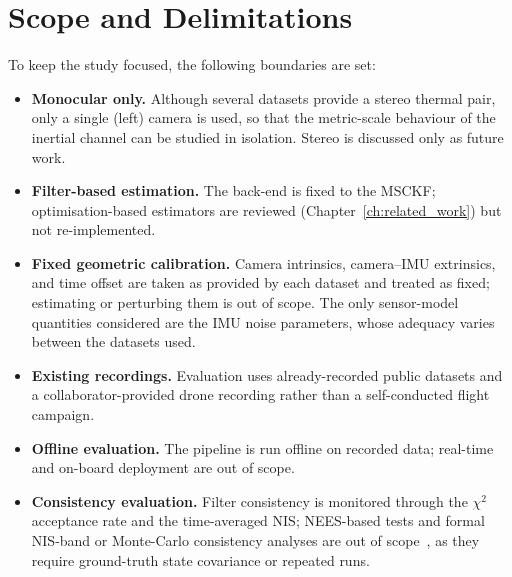 \section{Scope and Delimitations}
\label{sec:scopeanddelimitations}

To keep the study focused, the following boundaries are set:
%
\begin{itemize}
  \item \textbf{Monocular only.} Although several datasets provide a stereo thermal pair, only a single (left) camera is used, so that the metric-scale behaviour of the inertial channel can be studied in isolation. Stereo is discussed only as future work.
  \item \textbf{Filter-based estimation.} The back-end is fixed to the MSCKF; optimisation-based estimators are reviewed (Chapter~\ref{ch:related_work}) but not re-implemented.
  \item \textbf{Fixed geometric calibration.} Camera intrinsics, camera--IMU extrinsics, and time offset are taken as provided by each dataset and treated as fixed; estimating or perturbing them is out of scope. The only sensor-model quantities considered are the IMU noise parameters, whose adequacy varies between the datasets used.
  \item \textbf{Existing recordings.} Evaluation uses already-recorded public datasets and a collaborator-provided drone recording rather than a self-conducted flight campaign.
  \item \textbf{Offline evaluation.} The pipeline is run offline on recorded data; real-time and on-board deployment are out of scope.
  \item \textbf{Consistency evaluation.} Filter consistency is monitored through the $\chi^2$ acceptance rate and the time-averaged NIS; NEES-based tests and formal NIS-band or Monte-Carlo consistency analyses are out of scope~\cite{BarShalom_2001}, as they require ground-truth state covariance or repeated runs.
\end{itemize}